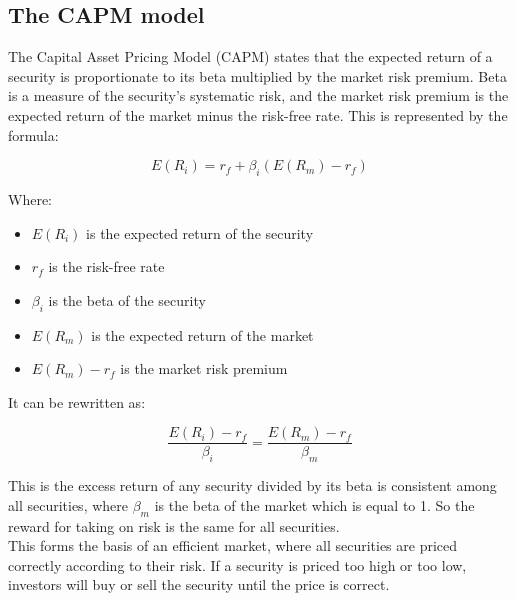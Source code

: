 \subsection*{The CAPM model}
The Capital Asset Pricing Model (CAPM) states that the expected return of a security is proportionate to its beta multiplied by the market risk premium. Beta is a measure of the security's systematic risk, and the market risk premium is the expected return of the market minus the risk-free rate. This is represented by the formula:

\begin{equation}
    E(R_i) = r_f + \beta_i(E(R_m) - r_f)
\end{equation}

Where:
\begin{itemize}
    \item $E(R_i)$ is the expected return of the security
    \item $r_f$ is the risk-free rate
    \item $\beta_i$ is the beta of the security
    \item $E(R_m)$ is the expected return of the market
    \item $E(R_m) - r_f$ is the market risk premium
\end{itemize}

It can be rewritten as:

\begin{equation}
    \frac{E(R_i) - r_f}{\beta_i} = \frac{E(R_m) - r_f}{\beta_m}
\end{equation}

This is the excess return of any security divided by its beta is consistent among all securities, where $\beta_m$ is the beta of the market which is equal to 1. So the reward for taking on risk is the same for all securities.\\

This forms the basis of an efficient market, where all securities are priced correctly according to their risk. If a security is priced too high or too low, investors will buy or sell the security until the price is correct.\\

